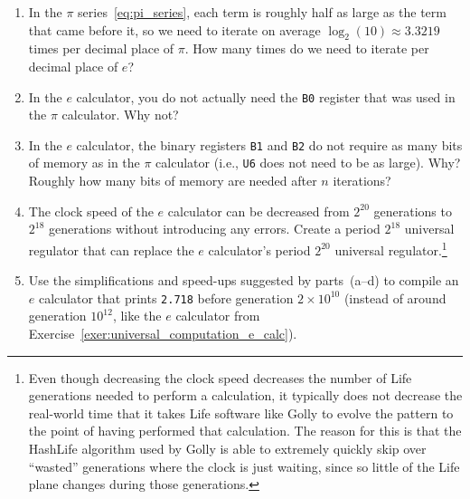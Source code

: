 \begin{multicols}{2}
\begin{problem}
		\begin{enumerate}[label=\bf\color{ocre}(\alph*)]
			\item In the $\pi$ series~\eqref{eq:pi_series}, each term is roughly half as large as the term that came before it, so we need to iterate on average $\log_2(10) \approx 3.3219$ times per decimal place of $\pi$. How many times do we need to iterate per decimal place of $e$?
			
			\item In the $e$ calculator, you do not actually need the \texttt{B0} register that was used in the $\pi$ calculator. Why not?
			
			\item In the $e$ calculator, the binary registers \texttt{B1} and \texttt{B2} do not require as many bits of memory as in the $\pi$ calculator (i.e., \texttt{U6} does not need to be as large). Why? Roughly how many bits of memory are needed after $n$ iterations?
			
			\item The  clock speed of the $e$ calculator can be decreased from $2^{20}$ generations to $2^{18}$ generations without introducing any errors. Create a period $2^{18}$ universal regulator that can replace the $e$ calculator's period $2^{20}$ universal regulator.\footnote{Even though decreasing the clock speed decreases the number of Life generations needed to perform a calculation, it typically does not decrease the real-world time that it takes Life software like Golly to evolve the pattern to the point of having performed that calculation. The reason for this is that the HashLife algorithm used by Golly is able to extremely quickly skip over ``wasted'' generations where the clock is just waiting, since so little of the Life plane changes during those generations.}
			
			\item Use the simplifications and speed-ups suggested by parts~(a--d) to compile an $e$ calculator that prints \texttt{2.718} before generation $2\times 10^{10}$ (instead of around generation $10^{12}$, like the $e$ calculator from Exercise~\ref{exer:universal_computation_e_calc}).
		\end{enumerate}
	\end{problem}
	

\end{multicols}
